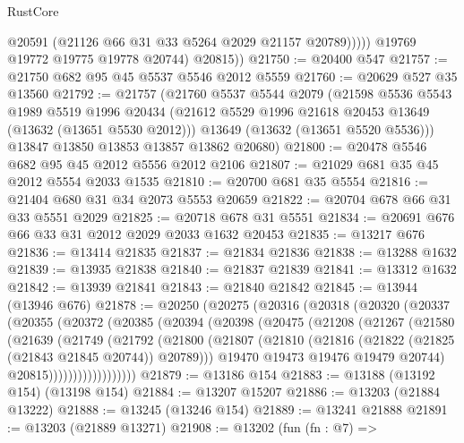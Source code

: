 \begin{lexlean}{RustCore}
\begin{coremodule}
                  @20591
                  (@21126 @66 @31 @33 @5264 @2029 @21157 @20789)))))
          @19769
          @19772
          @19775
          @19778
          @20744)
        @20815))
@21750 := @20400 @547
@21757 := @21750 @682 @95 @45 @5537 @5546 @2012 @5559
@21760 := @20629 @527 @35 @13560
@21792 := @21757
    (@21760
      @5537
      @5544
      @2079
      (@21598
        @5536
        @5543
        @1989
        @5519
        @1996
        @20434
        (@21612 @5529 @1996 @21618 @20453 @13649 (@13632 (@13651 @5530 @2012)))
        @13649
        (@13632 (@13651 @5520 @5536)))
      @13847
      @13850
      @13853
      @13857
      @13862
      @20680)
@21800 := @20478 @5546 @682 @95 @45 @2012 @5556 @2012 @2106
@21807 := @21029 @681 @35 @45 @2012 @5554 @2033 @1535
@21810 := @20700 @681 @35 @5554
@21816 := @21404 @680 @31 @34 @2073 @5553 @20659
@21822 := @20704 @678 @66 @31 @33 @5551 @2029
@21825 := @20718 @678 @31 @5551
@21834 := @20691 @676 @66 @33 @31 @2012 @2029 @2033 @1632 @20453
@21835 := @13217 @676
@21836 := @13414 @21835
@21837 := @21834 @21836
@21838 := @13288 @1632
@21839 := @13935 @21838
@21840 := @21837 @21839
@21841 := @13312 @1632
@21842 := @13939 @21841
@21843 := @21840 @21842
@21845 := @13944 (@13946 @676)
@21878 := @20250
    (@20275
      (@20316
        (@20318
          (@20320
            (@20337
              (@20355
                (@20372
                  (@20385
                    (@20394
                      (@20398
                        (@20475
                          (@21208
                            (@21267
                              (@21580
                                (@21639
                                  (@21749
                                    (@21792
                                      (@21800
                                        (@21807
                                          (@21810
                                            (@21816
                                              (@21822 (@21825 (@21843 @21845 @20744)) @20789)))
                                          @19470
                                          @19473
                                          @19476
                                          @19479
                                          @20744)
                                        @20815))))))))))))))))))
@21879 := @13186 @154
@21883 := @13188 (@13192 @154) (@13198 @154)
@21884 := @13207 @15207
@21886 := @13203 (@21884 @13222)
@21888 := @13245 (@13246 @154)
@21889 := @13241 @21888
@21891 := @13203 (@21889 @13271)
@21908 := @13202
    (fun (fn : @7) =>

\end{coremodule}
\end{lexlean}
